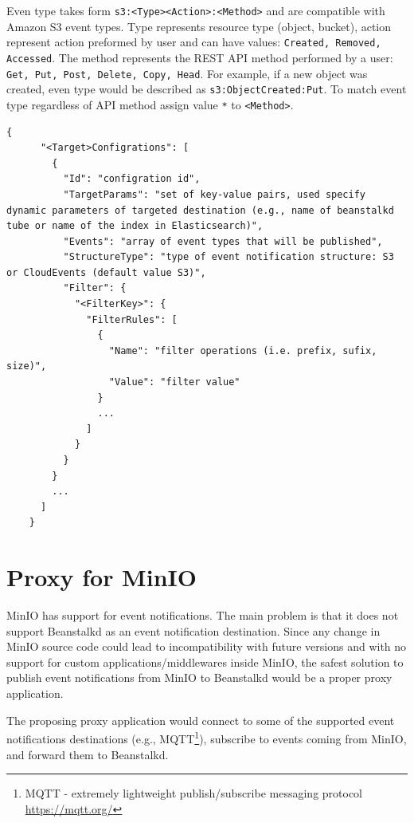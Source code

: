     Even type takes form \texttt{s3:<Type><Action>:<Method>} and are compatible with Amazon S3 event types. Type represents resource type (object, bucket), action represent action preformed by user and can have values: \texttt{Created, Removed, Accessed}. The method represents the REST API method performed by a user: \texttt{Get, Put, Post, Delete, Copy, Head}. For example, if a new object was created, even type would be described as \texttt{\newline s3:ObjectCreated:Put}. To match event type regardless of API method assign value \texttt{*} to \texttt{<Method>}.

    \begin{minipage}{\linewidth}
    \begin{lstlisting}[style=jsonStyle, caption=Strucute of event notification configuration,    label=lst:eventConfiguration]
    {
      "<Target>Configrations": [
        {
          "Id": "configration id",
          "TargetParams": "set of key-value pairs, used specify dynamic parameters of targeted destination (e.g., name of beanstalkd tube or name of the index in Elasticsearch)",
          "Events": "array of event types that will be published",
          "StructureType": "type of event notification structure: S3 or CloudEvents (default value S3)",
          "Filter": {
            "<FilterKey>": {
              "FilterRules": [
                {
                  "Name": "filter operations (i.e. prefix, sufix, size)",
                  "Value": "filter value"
                }
                ...
              ]
            }
          }
        }
        ...
      ]
    }
    \end{lstlisting}
    \end{minipage}


\section{Proxy for MinIO}
    MinIO has support for event notifications. The main problem is that it does not support Beanstalkd as an event notification destination. Since any change in MinIO source code could lead to incompatibility with future versions and with no support for custom applications/middlewares inside MinIO, the safest solution to publish event notifications from MinIO to Beanstalkd would be a proper proxy application.

    The proposing proxy application would connect to some of the supported event notifications destinations (e.g., MQTT\footnote{MQTT - extremely lightweight publish/subscribe messaging protocol {\url{https://mqtt.org/}}}), subscribe to events coming from MinIO, and forward them to Beanstalkd.


